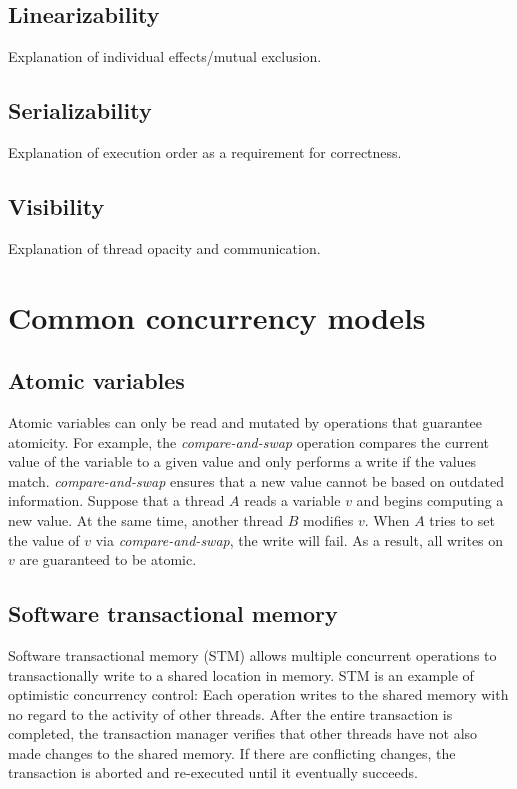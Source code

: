 \documentclass{sig-alternate}
\begin{document}
\subsection{Linearizability}

Explanation of individual effects/mutual exclusion.

\subsection{Serializability}

Explanation of execution order as a requirement for correctness.

\subsection{Visibility}

Explanation of thread opacity and communication.

\section{Common concurrency models}

\subsection{Atomic variables}

Atomic variables can only be read and mutated by operations that guarantee atomicity. For example, the \emph{compare-and-swap} operation compares the current value of the variable to a given value and only performs a write if the values match. \emph{compare-and-swap} ensures that a new value cannot be based on outdated information. Suppose that a thread $A$ reads a variable $v$ and begins computing a new value. At the same time, another thread $B$ modifies $v$. When $A$ tries to set the value of $v$ via \emph{compare-and-swap}, the write will fail. As a result, all writes on $v$ are guaranteed to be atomic.

\subsection{Software transactional memory}

Software transactional memory (STM) allows multiple concurrent operations to transactionally write to a shared location in memory. STM is an example of optimistic concurrency control: Each operation writes to the shared memory with no regard to the activity of other threads. After the entire transaction is completed, the transaction manager verifies that other threads have not also made changes to the shared memory. If there are conflicting changes, the transaction is aborted and re-executed until it eventually succeeds.~\cite{Shavit1995}
\end{document}

